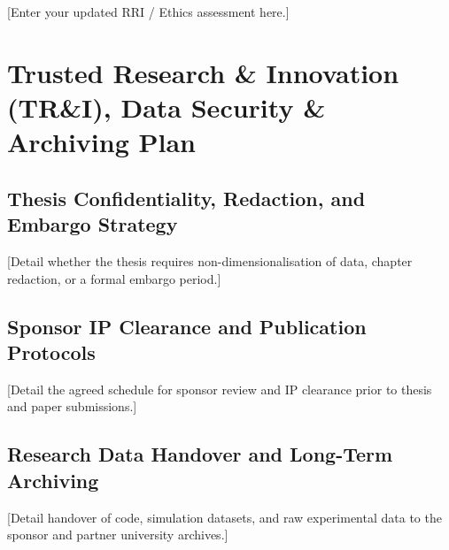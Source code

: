\documentclass[year3]{../idcore-ar}
\begin{document}
[Enter your updated RRI / Ethics assessment here.]


\section{Trusted Research \& Innovation (TR\&I), Data Security \& Archiving Plan}

\subsection{Thesis Confidentiality, Redaction, and Embargo Strategy}
[Detail whether the thesis requires non-dimensionalisation of data, chapter redaction, or a formal embargo period.]

\subsection{Sponsor IP Clearance and Publication Protocols}
[Detail the agreed schedule for sponsor review and IP clearance prior to thesis and paper submissions.]

\subsection{Research Data Handover and Long-Term Archiving}
[Detail handover of code, simulation datasets, and raw experimental data to the sponsor and partner university archives.]
\end{document}
